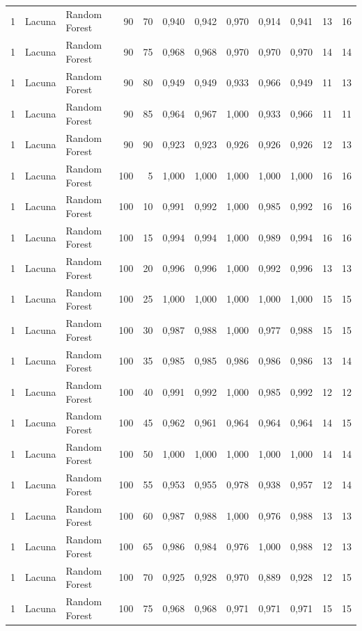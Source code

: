 \begin{longtable}{@{}rllrrrrrrrrr@{}}
1 & Lacuna & Random Forest & 90 & 70 & 0,940 & 0,942 & 0,970 & 0,914 & 0,941 & 13 & 16 \\
1 & Lacuna & Random Forest & 90 & 75 & 0,968 & 0,968 & 0,970 & 0,970 & 0,970 & 14 & 14 \\
1 & Lacuna & Random Forest & 90 & 80 & 0,949 & 0,949 & 0,933 & 0,966 & 0,949 & 11 & 13 \\
1 & Lacuna & Random Forest & 90 & 85 & 0,964 & 0,967 & 1,000 & 0,933 & 0,966 & 11 & 11 \\
1 & Lacuna & Random Forest & 90 & 90 & 0,923 & 0,923 & 0,926 & 0,926 & 0,926 & 12 & 13 \\
1 & Lacuna & Random Forest & 100 & 5 & 1,000 & 1,000 & 1,000 & 1,000 & 1,000 & 16 & 16 \\
1 & Lacuna & Random Forest & 100 & 10 & 0,991 & 0,992 & 1,000 & 0,985 & 0,992 & 16 & 16 \\
1 & Lacuna & Random Forest & 100 & 15 & 0,994 & 0,994 & 1,000 & 0,989 & 0,994 & 16 & 16 \\
1 & Lacuna & Random Forest & 100 & 20 & 0,996 & 0,996 & 1,000 & 0,992 & 0,996 & 13 & 13 \\
1 & Lacuna & Random Forest & 100 & 25 & 1,000 & 1,000 & 1,000 & 1,000 & 1,000 & 15 & 15 \\
1 & Lacuna & Random Forest & 100 & 30 & 0,987 & 0,988 & 1,000 & 0,977 & 0,988 & 15 & 15 \\
1 & Lacuna & Random Forest & 100 & 35 & 0,985 & 0,985 & 0,986 & 0,986 & 0,986 & 13 & 14 \\
1 & Lacuna & Random Forest & 100 & 40 & 0,991 & 0,992 & 1,000 & 0,985 & 0,992 & 12 & 12 \\
1 & Lacuna & Random Forest & 100 & 45 & 0,962 & 0,961 & 0,964 & 0,964 & 0,964 & 14 & 15 \\
1 & Lacuna & Random Forest & 100 & 50 & 1,000 & 1,000 & 1,000 & 1,000 & 1,000 & 14 & 14 \\
1 & Lacuna & Random Forest & 100 & 55 & 0,953 & 0,955 & 0,978 & 0,938 & 0,957 & 12 & 14 \\
1 & Lacuna & Random Forest & 100 & 60 & 0,987 & 0,988 & 1,000 & 0,976 & 0,988 & 13 & 13 \\
1 & Lacuna & Random Forest & 100 & 65 & 0,986 & 0,984 & 0,976 & 1,000 & 0,988 & 12 & 13 \\
1 & Lacuna & Random Forest & 100 & 70 & 0,925 & 0,928 & 0,970 & 0,889 & 0,928 & 12 & 15 \\
1 & Lacuna & Random Forest & 100 & 75 & 0,968 & 0,968 & 0,971 & 0,971 & 0,971 & 15 & 15 \\

\end{longtable}
